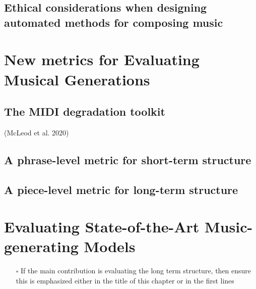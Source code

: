 \documentclass[12pt,a4paper,]{report}
\providecommand{\tightlist}{%
  \setlength{\itemsep}{0pt}\setlength{\parskip}{0pt}}
\begin{document}
\hypertarget{ethical-considerations-when-designing-automated-methods-for-composing-music}{%
\section{Ethical considerations when designing automated methods for
composing
music}\label{ethical-considerations-when-designing-automated-methods-for-composing-music}}

\hypertarget{new-metrics-for-evaluating-musical-generations}{%
\chapter{New metrics for Evaluating Musical
Generations}\label{new-metrics-for-evaluating-musical-generations}}

\hypertarget{the-midi-degradation-toolkit}{%
\section{The MIDI degradation
toolkit}\label{the-midi-degradation-toolkit}}

(McLeod et al. 2020)

\hypertarget{a-phrase-level-metric-for-short-term-structure}{%
\section{A phrase-level metric for short-term
structure}\label{a-phrase-level-metric-for-short-term-structure}}

\hypertarget{a-piece-level-metric-for-long-term-structure}{%
\section{A piece-level metric for long-term
structure}\label{a-piece-level-metric-for-long-term-structure}}

\hypertarget{evaluating-state-of-the-art-music-generating-models}{%
\chapter{Evaluating State-of-the-Art Music-generating
Models}\label{evaluating-state-of-the-art-music-generating-models}}

\begin{itemize}
\tightlist
\item[$\square$]
  If the main contribution is evaluating the long term structure, then
  ensure this is emphasized either in the title of this chapter or in
  the first lines
\end{itemize}
\end{document}
